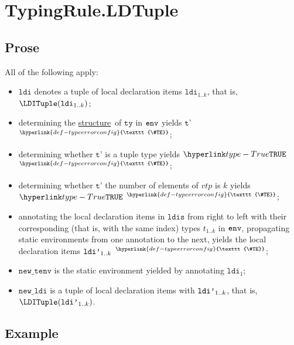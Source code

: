 \documentclass{book}
\newcommand\TypeErrorConfig[0]{\hyperlink{def-typeerrorconfig}{\texttt{\#TE}}}
\newcommand\ProseOrTypeError[0]{\hyperlink{def-proseortypeerror}{$^{\TypeErrorConfig}$}}
\newcommand\structure[0]{\hyperlink{def-structure}{structure}}
\newcommand\newtenv[0]{\texttt{new\_tenv}}
\newcommand\ldi[0]{\texttt{ldi}}
\newcommand\tty[0]{\texttt{ty}}
\newcommand\ldis[0]{\texttt{ldis}}
\newcommand\newldi[0]{\texttt{new\_ldi}}
\newcommand\vtp[0]{\texttt{t'}}
\begin{document}
\section{TypingRule.LDTuple\label{sec:TypingRule.LDTuple}}

\subsection{Prose}
All of the following apply:
\begin{itemize}
  \item $\ldi$ denotes a tuple of local declaration items $\ldi_{1..k}$, that is, $\LDITuple(\ldi_{1..k})$;
  \item determining the \structure\ of $\tty$ in $\texttt{env}$ yields $\vtp$ \ProseOrTypeError;
  \item determining whether $\vtp$ is a tuple type yields $\True$ \ProseOrTypeError;
  \item determining whether $\vtp$ the number of elements of $vtp$ is $k$ yields $\True$ \ProseOrTypeError;
  \item annotating the local declaration items in $\ldis$ from right to left with their corresponding
        (that is, with the same index) types $t_{1..k}$ in $\texttt{env}$,
        propagating static environments from one annotation to the next,
        yields the local declaration items $\texttt{ldi'}_{1..k}$ \ProseOrTypeError;
  \item $\newtenv$ is the static environment yielded by annotating $\ldi_1$;
  \item $\newldi$ is a tuple of local declaration items with $\texttt{ldi'}_{1..k}$, that is, \\
        $\LDITuple(\ldip_{1..k})$.
\end{itemize}

\subsection{Example}

\end{document}
